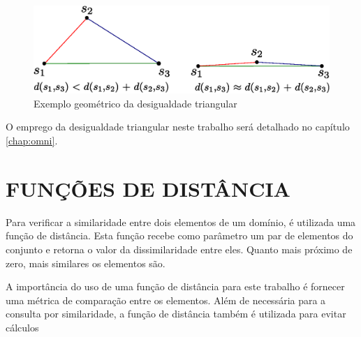 \begin{figure}[H]
\centering
\includegraphics[width=.8\textwidth]{dados/figuras/desig_tri.eps}
\caption{Exemplo geométrico da desigualdade triangular}
\label{fig:destri}
\end{figure}

O emprego da desigualdade triangular neste trabalho será detalhado no capítulo \ref{chap:omni}.

\section{FUNÇÕES DE DISTÂNCIA}
\label{sec:funcdist}
Para verificar a similaridade entre dois elementos de um domínio, é utilizada uma função de distância. Esta função recebe como parâmetro um par
de elementos do conjunto e retorna o valor da dissimilaridade entre eles. Quanto mais próximo de zero, mais similares os elementos são.\par

A importância do uso de uma função de distância para este trabalho é fornecer uma métrica de comparação entre os elementos. Além de
necessária para a consulta por similaridade, a função de distância também é utilizada para evitar cálculos 






